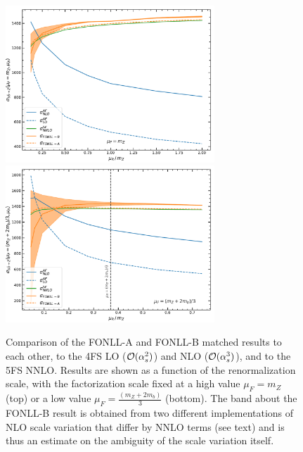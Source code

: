 \documentclass[12pt]{article}
\newcommand{\order}[1]{{\cal O}(#1)}
\begin{document}
\begin{figure}
  \begin{center}
    \includegraphics[width=0.7\textwidth]{muR_mh_var.pdf}
    \includegraphics[width=0.7\textwidth]{muR_var.pdf} 
    \caption{\label{fig:muR_var} Comparison of the FONLL-A and FONLL-B 
      matched results to each other, to the 4FS LO ($\order{\alpha_s^2}$)
      and NLO  ($\order{\alpha_s^3}$), and to the 5FS NNLO. Results are shown as a function of the
      renormalization scale, with the factorization scale fixed at a high value 
      $\mu_F=m_Z$  (top) or a low value  $\mu_F=\frac{(m_Z+2m_b)}{3}$
      (bottom). The band about the FONLL-B result is obtained from two
      different implementations of NLO scale variation that differ by NNLO
      terms (see text) and is thus an estimate on the ambiguity of the
      scale variation itself.
    }
  \end{center}
\end{figure}
%
\end{document}
